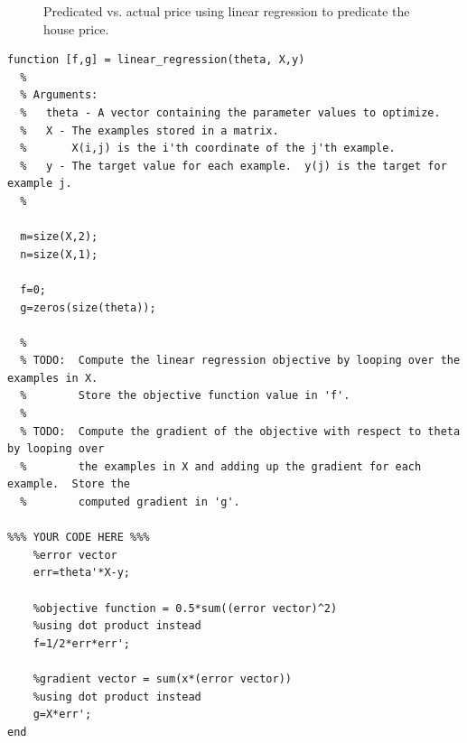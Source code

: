 \documentclass[12pt] {article}
\begin{document}
\begin{figure}[!tbh]
\centering        
   \caption{ Predicated vs. actual price using linear regression to predicate the house price.}
   \label{fig:fig}
\end{figure}

\newpage
\begin{lstlisting}
function [f,g] = linear_regression(theta, X,y)
  %
  % Arguments:
  %   theta - A vector containing the parameter values to optimize.
  %   X - The examples stored in a matrix.
  %       X(i,j) is the i'th coordinate of the j'th example.
  %   y - The target value for each example.  y(j) is the target for example j.
  %
  
  m=size(X,2);
  n=size(X,1);

  f=0;
  g=zeros(size(theta));

  %
  % TODO:  Compute the linear regression objective by looping over the examples in X.
  %        Store the objective function value in 'f'.
  %
  % TODO:  Compute the gradient of the objective with respect to theta by looping over
  %        the examples in X and adding up the gradient for each example.  Store the
  %        computed gradient in 'g'.
  
%%% YOUR CODE HERE %%%
    %error vector
    err=theta'*X-y;
    
    %objective function = 0.5*sum((error vector)^2) 
    %using dot product instead
    f=1/2*err*err';
    
    %gradient vector = sum(x*(error vector))
    %using dot product instead
    g=X*err';
end
\end{lstlisting}
\end{document}
